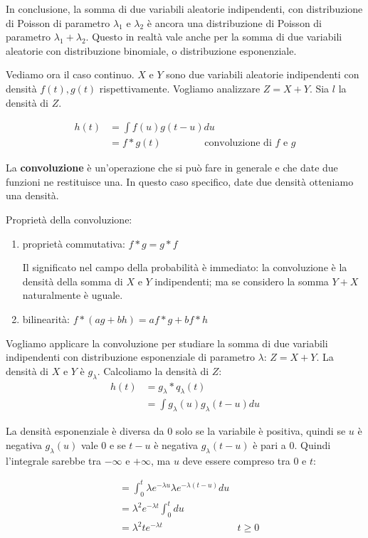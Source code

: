 \documentclass[a4paper,12pt]{book}
\begin{document}
In conclusione, la somma di due variabili aleatorie indipendenti, con distribuzione di Poisson di parametro $\lambda_1$ e $\lambda_2$ è ancora una distribuzione di Poisson di parametro $ \lambda_1 + \lambda_2 $. Questo in realtà vale anche per la somma di due variabili aleatorie con distribuzione binomiale, o distribuzione esponenziale.

Vediamo ora il caso continuo. $ X $ e $ Y $ sono due variabili aleatorie indipendenti con densità $ f(t), g(t) $ rispettivamente. Vogliamo analizzare $ Z = X + Y$. Sia $ l $ la densità di $ Z $. 

\begin{align*}
	h(t) & = \int f(u) g(t-u) du \\
	& = f * g(t) \qquad \qquad \text{ convoluzione di } f \text{ e } g
\end{align*}

La \textbf{convoluzione} è un'operazione che si può fare in generale e che date due funzioni ne restituisce una. In questo caso specifico, date due densità otteniamo una densità.

Proprietà della convoluzione: 
\begin{enumerate}
	\item proprietà commutativa: $ f * g = g*f $
	
		Il significato nel campo della probabilità è immediato: la convoluzione è la densità della somma di $ X $ e $ Y $ indipendenti; ma se considero la somma $ Y + X $ naturalmente è uguale. 
	\item bilinearità: $ f * (ag + bh ) = af * g + bf * h $ 
\end{enumerate}

Vogliamo applicare la convoluzione per studiare la somma di due variabili indipendenti con distribuzione esponenziale di parametro $ \lambda $: $ Z = X + Y $. La densità di $ X $ e $ Y $ è $ g_\lambda $. Calcoliamo la densità di $ Z $:
\begin{align*}
	h(t) & = g_\lambda * q_\lambda(t) \\
	& = \int g_\lambda(u) g_\lambda(t-u) du
\end{align*}

La densità esponenziale è diversa da 0 solo se la variabile è positiva, quindi se $ u $ è negativa $ g_\lambda(u) $ vale 0 e se $ t-u $ è negativa $ g_\lambda(t-u) $ è pari a 0. Quindi l'integrale sarebbe tra $ - \infty $ e $ +\infty $, ma $ u $ deve essere compreso tra 0 e $ t $:

\begin{align*}
	& = \int_{0}^{t} \lambda e ^{-\lambda u} \lambda e^{-\lambda(t-u)} du \\
	& = \lambda^2 e^{-\lambda t} \int_{0}^{t} du \\
	& = \lambda^2 t e^{-\lambda t} & t \ge 0
\end{align*}
\end{document}

